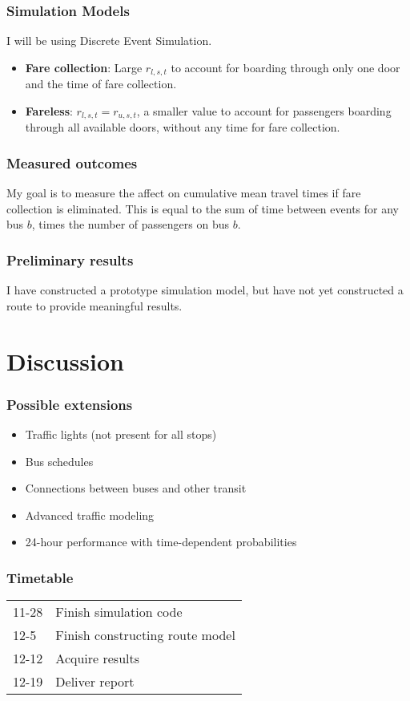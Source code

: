 \documentclass[xcolor=x11names,compress, 10pt]{beamer}
\renewcommand{\(}{\begin{columns}}
\renewcommand{\)}{\end{columns}}
\newcommand{\<}[1]{\begin{column}{#1}}
\renewcommand{\>}{\end{column}}
\begin{document}
\begin{frame}
    \frametitle{Simulation Models}

    I will be using Discrete Event Simulation.

    \begin{itemize}
        \item \textbf{Fare collection}: Large $r_{l,s,t}$ to account for
            boarding through only one door and the time of fare
            collection.
        \item \textbf{Fareless}: $r_{l,s,t} = r_{u,s,t}$, a smaller
            value to account for passengers boarding through all
            available doors, without any time for fare collection.
    \end{itemize}
\end{frame}

\begin{frame}
    \frametitle{Measured outcomes}

    My goal is to measure the affect on cumulative mean travel times if
    fare collection is eliminated. This is equal to the sum of time
    between events for any bus $b$, times the number of passengers on
    bus $b$.

\end{frame}


\begin{frame}
\frametitle{Preliminary results}

I have constructed a prototype simulation model, but have not yet
constructed a route to provide meaningful results.
\end{frame}

\section{Discussion} 

\begin{frame}
\frametitle{Possible extensions}

\begin{itemize}
    \item Traffic lights (not present for all stops)
    \item Bus schedules
    \item Connections between buses and other transit
    \item Advanced traffic modeling
    \item 24-hour performance with time-dependent probabilities
\end{itemize}

\end{frame}

\begin{frame}
    \frametitle{Timetable}

    \begin{tabular}{ll}
        11-28 & Finish simulation code \\
        12-5 & Finish constructing route model \\
        12-12 & Acquire results \\
        12-19 & Deliver report \\
    \end{tabular}
\end{frame}
\end{document}
